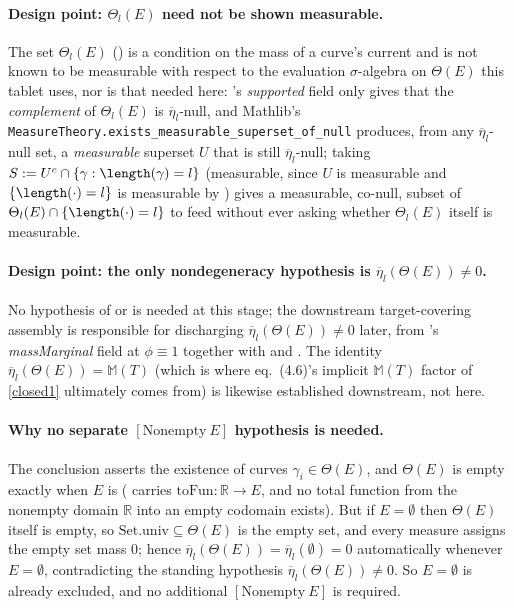 \begin{lemma}
  \paragraph{Design point: $\Theta_l(E)$ need not be shown measurable.} The set $\Theta_l(E)$
  () is a condition on the mass of a curve's current and is not known to be
  measurable with respect to the evaluation $\sigma$-algebra on $\Theta(E)$ this tablet uses, nor
  is that needed here: 's \emph{supported} field only gives that the
  \emph{complement} of $\Theta_l(E)$ is $\overline\eta_l$-null, and Mathlib's
  \texttt{MeasureTheory.exists\_measurable\_superset\_of\_null} produces, from any
  $\overline\eta_l$-null set, a \emph{measurable} superset $U$ that is still $\overline\eta_l$-null;
  taking $S := U^c \cap \{\gamma : \length(\gamma) = l\}$ (measurable, since $U$ is measurable and
  $\{\length(\cdot)=l\}$ is measurable by ) gives a measurable,
  co-null, subset of $\Theta_l(E) \cap \{\length(\cdot)=l\}$ to feed
   without ever asking whether $\Theta_l(E)$ itself is
  measurable.

  \paragraph{Design point: the only nondegeneracy hypothesis is $\overline\eta_l(\Theta(E)) \ne
  0$.} No hypothesis of  or  is needed at
  this stage; the downstream target-covering assembly is responsible for discharging
  $\overline\eta_l(\Theta(E)) \ne 0$ later, from 's \emph{massMarginal} field at
  $\phi \equiv 1$ together with  and . The
  identity $\overline\eta_l(\Theta(E)) = \mathbb{M}(T)$ (which is where eq.~(4.6)'s implicit
  $\mathbb{M}(T)$ factor of \eqref{closed1} ultimately comes from) is likewise established
  downstream, not here.

  \paragraph{Why no separate $[\mathrm{Nonempty}\ E]$ hypothesis is needed.} The conclusion
  asserts the existence of curves $\gamma_i \in \Theta(E)$, and $\Theta(E)$ is empty exactly when
  $E$ is ( carries $\mathrm{toFun}\colon\mathbb{R}\to E$, and no total function from
  the nonempty domain $\mathbb{R}$ into an empty codomain exists). But if $E=\emptyset$ then
  $\Theta(E)$ itself is empty, so $\mathrm{Set.univ}\subseteq\Theta(E)$ is the empty set, and every
  measure assigns the empty set mass $0$; hence $\overline\eta_l(\Theta(E)) =
  \overline\eta_l(\emptyset) = 0$ automatically whenever $E=\emptyset$, contradicting the standing
  hypothesis $\overline\eta_l(\Theta(E))\ne0$. So $E=\emptyset$ is already excluded, and no
  additional $[\mathrm{Nonempty}\ E]$ is required.
\end{lemma}
